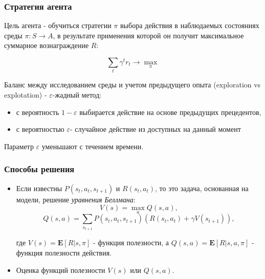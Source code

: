 \documentclass[12pt]{beamer}
\begin{document}
	\begin{frame}
		\frametitle{Стратегия агента}

			Цель агента - обучиться стратегии $\pi$ выбора действия в наблюдаемых состояниях среды $\pi:S\to A$, в результате применения которой он получит максимальное суммарное вознаграждение $R$:
			
			\[
				\sum\limits_t\gamma^t r_t \rightarrow \max_\pi
			\] 
			\par\bigskip
			
			Баланс между исследованием среды и учетом предыдущего опыта (exploration vs explotation) - $\varepsilon$-жадный метод:
			\begin{itemize}
				\item с вероятность $1-\varepsilon$ выбирается действие на основе предыдущих прецедентов,
				\item с вероятностью $\varepsilon$- случайное действие из доступных на данный момент
			\end{itemize}
			Параметр $\varepsilon$ уменьшают с течением времени.
	\end{frame}

	\begin{frame}
		\frametitle{Способы решения}

		\begin{itemize}
			\item Если известны $P(s_t,a_t,s_{t+1})$ и $R(s_t,a_t)$, то это задача, основанная на модели, решение \textit{уравнения Беллмана}:
			\[
				V(s)=\max_a Q(s,a),
			\]
			\[
				Q(s,a)=\sum_{s_{t+1}} P(s_t,a_t,s_{t+1})\left(R(s_t,a_t) + \gamma V(s_{t+1})\right),
			\]
			
			где $V(s)=\mathbf{E}[R|s,\pi]$ - функция полезности, а $Q(s,a)=\mathbf{E}[R|s,a,\pi]$ -  функция полезности действия.

			\item Оценка функций полезности $V(s)$ или $Q(s,a)$.
		\end{itemize}
		
		
	\end{frame}
\end{document}

